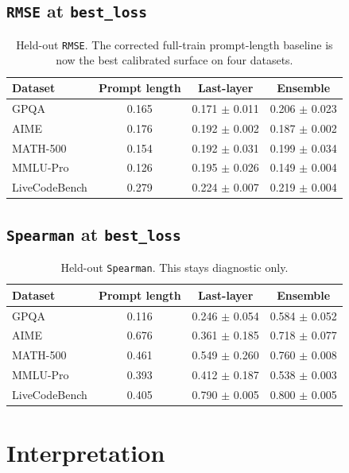 \documentclass[11pt]{article}
\begin{document}
\subsection*{\texttt{RMSE} at \texttt{best\_loss}}

\begin{table}[h]
\centering
\small
\begin{tabular}{lccc}
\toprule
Dataset & Prompt length & Last-layer & Ensemble \\
\midrule
GPQA & 0.165 & 0.171 $\pm$ 0.011 & 0.206 $\pm$ 0.023 \\
AIME & 0.176 & 0.192 $\pm$ 0.002 & 0.187 $\pm$ 0.002 \\
MATH-500 & 0.154 & 0.192 $\pm$ 0.031 & 0.199 $\pm$ 0.034 \\
MMLU-Pro & 0.126 & 0.195 $\pm$ 0.026 & 0.149 $\pm$ 0.004 \\
LiveCodeBench & 0.279 & 0.224 $\pm$ 0.007 & 0.219 $\pm$ 0.004 \\
\bottomrule
\end{tabular}
\caption{Held-out \texttt{RMSE}. The corrected full-train prompt-length baseline is now the best calibrated surface on four datasets.}
\end{table}

\subsection*{\texttt{Spearman} at \texttt{best\_loss}}

\begin{table}[h]
\centering
\small
\begin{tabular}{lccc}
\toprule
Dataset & Prompt length & Last-layer & Ensemble \\
\midrule
GPQA & 0.116 & 0.246 $\pm$ 0.054 & 0.584 $\pm$ 0.052 \\
AIME & 0.676 & 0.361 $\pm$ 0.185 & 0.718 $\pm$ 0.077 \\
MATH-500 & 0.461 & 0.549 $\pm$ 0.260 & 0.760 $\pm$ 0.008 \\
MMLU-Pro & 0.393 & 0.412 $\pm$ 0.187 & 0.538 $\pm$ 0.003 \\
LiveCodeBench & 0.405 & 0.790 $\pm$ 0.005 & 0.800 $\pm$ 0.005 \\
\bottomrule
\end{tabular}
\caption{Held-out \texttt{Spearman}. This stays diagnostic only.}
\end{table}

\section{Interpretation}
\end{document}
